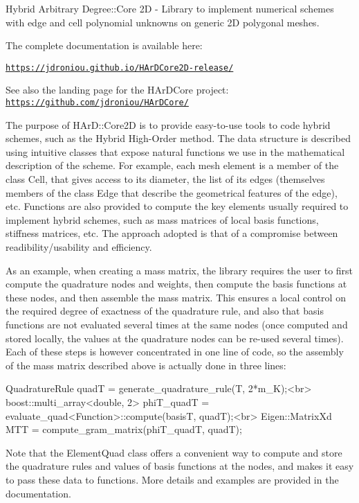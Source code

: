 Hybrid Arbitrary Degree\+::\+Core 2D -\/ Library to implement numerical schemes with edge and cell polynomial unknowns on generic 2D polygonal meshes.

The complete documentation is available here\+:

\href{https://jdroniou.github.io/HArDCore2D-release/}{\tt https\+://jdroniou.\+github.\+io/\+H\+Ar\+D\+Core2\+D-\/release/}

See also the landing page for the H\+Ar\+D\+Core project\+: \href{https://github.com/jdroniou/HArDCore/}{\tt https\+://github.\+com/jdroniou/\+H\+Ar\+D\+Core/}

The purpose of H\+Ar\+D\+::\+Core2D is to provide easy-\/to-\/use tools to code hybrid schemes, such as the Hybrid High-\/\+Order method. The data structure is described using intuitive classes that expose natural functions we use in the mathematical description of the scheme. For example, each mesh element is a member of the class \textquotesingle{}Cell\textquotesingle{}, that gives access to its diameter, the list of its edges (themselves members of the class \textquotesingle{}Edge\textquotesingle{} that describe the geometrical features of the edge), etc. Functions are also provided to compute the key elements usually required to implement hybrid schemes, such as mass matrices of local basis functions, stiffness matrices, etc. The approach adopted is that of a compromise between readibility/usability and efficiency.

As an example, when creating a mass matrix, the library requires the user to first compute the quadrature nodes and weights, then compute the basis functions at these nodes, and then assemble the mass matrix. This ensures a local control on the required degree of exactness of the quadrature rule, and also that basis functions are not evaluated several times at the same nodes (once computed and stored locally, the values at the quadrature nodes can be re-\/used several times). Each of these steps is however concentrated in one line of code, so the assembly of the mass matrix described above is actually done in three lines\+:


\begin{DoxyCode}
QuadratureRule quadT = generate\_quadrature\_rule(T, 2*m\_K);<br>
boost::multi\_array<double, 2> phiT\_quadT = evaluate\_quad<Function>::compute(basisT, quadT);<br>
Eigen::MatrixXd MTT = compute\_gram\_matrix(phiT\_quadT, quadT);
\end{DoxyCode}


Note that the {\ttfamily Element\+Quad} class offers a convenient way to compute and store the quadrature rules and values of basis functions at the nodes, and makes it easy to pass these data to functions. More details and examples are provided in the documentation.

